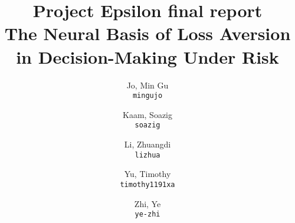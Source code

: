\documentclass[11pt]{article}
\title{Project Epsilon final report \\ The Neural Basis of Loss Aversion in Decision-Making Under Risk}
\author{
  Jo, Min Gu\\
  \texttt{mingujo}
  \and
  Kaam, Soazig\\
  \texttt{soazig}
  \and
  Li, Zhuangdi\\
  \texttt{lizhua}
  \and
  Yu, Timothy\\
  \texttt{timothy1191xa}
  \and
  Zhi, Ye\\
  \texttt{ye-zhi}
  }
\begin{document}
\maketitle
\abstract{}
















\newpage




\end{document}
